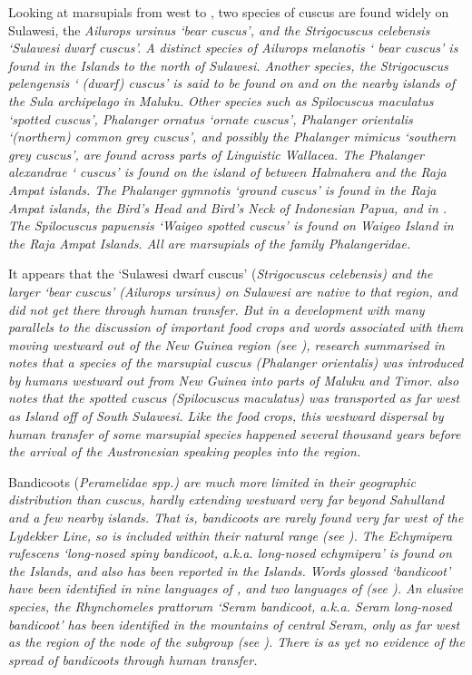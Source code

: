 Looking at marsupials from west to ,
two species of cuscus are found widely on Sulawesi,
the \it{Ailurops ursinus} ‘bear cuscus’,
and the \it{Strigocuscus celebensis} ‘Sulawesi dwarf cuscus’.
A distinct species of \it{Ailurops melanotis} ‘ bear cuscus’
is found in the  Islands to the north of Sulawesi.
Another species, the \it{Strigocuscus pelengensis} ‘ (dwarf)
cuscus’ is said to be found on 
and on the nearby islands of the Sula archipelago in Maluku.
Other species such as \it{Spilocuscus maculatus} ‘spotted cuscus’,
\it{Phalanger ornatus} ‘ornate cuscus’,
\it{Phalanger orientalis} ‘(northern) common grey cuscus’,
and possibly the \it{Phalanger mimicus} ‘southern grey cuscus’,
are found across parts of Linguistic Wallacea.
The \it{Phalanger alexandrae} ‘ cuscus’ is found on the island
of  between Halmahera
and the Raja Ampat islands.
The \it{Phalanger gymnotis} ‘ground cuscus’ is found in the Raja
Ampat islands, the Bird’s Head and Bird’s Neck of Indonesian Papua, and in .
The \it{Spilocuscus papuensis} ‘Waigeo spotted cuscus’ is found
on Waigeo Island in the Raja Ampat Islands.
All are marsupials of the family \it{Phalangeridae}.

It appears that the ‘Sulawesi dwarf cuscus’ (\it{Strigocuscus
celebensis}) and the larger ‘bear cuscus’ (\it{Ailurops ursinus}) on Sulawesi
are native to that region,
and did not get there through human transfer.
But in a development with many parallels to the discussion of
important food crops and words associated with them moving westward out of the New
Guinea region (see ),
research summarised in \citet[260]{Schapper2011} notes that a
species of the marsupial cuscus (\it{Phalanger orientalis}) was
introduced by humans westward out from New Guinea into parts
of Maluku and Timor.
\citet[130--132]{Flannery1990} also notes that the spotted cuscus (\it{Spilocuscus
maculatus}) was transported as far west as  Island off of South Sulawesi.
Like the food crops,
this westward dispersal by human transfer of some marsupial species
happened several thousand years before the arrival of the Austronesian
speaking peoples into the region.

Bandicoots (\it{Peramelidae spp.}) are much more limited in
their geographic distribution than cuscus,
hardly extending westward very far beyond Sahulland
and a few nearby islands.
That is, bandicoots are rarely found very far west of the Lydekker
Line, so  is included within their natural range (see ).
The \it{Echymipera rufescens} ‘long-nosed spiny bandicoot, a.k.a.
long-nosed echymipera’ is found on the  Islands,
and also has been reported in the  Islands.
Words glossed ‘bandicoot’ have been identified in nine languages
of , and two languages of  (see ).
An elusive species, the \it{Rhynchomeles prattorum} ‘Seram bandicoot, a.k.a.
Seram long-nosed bandicoot’ has been identified in the mountains
of central Seram, only as far west as the region of the 
node of the  subgroup (see ).
There is as yet no evidence of the spread of bandicoots through human transfer.

